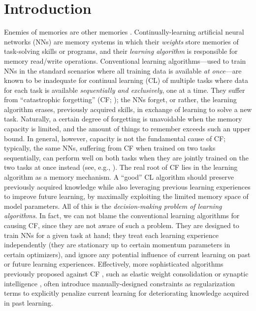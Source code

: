 \documentclass{article}
\begin{document}
\section{Introduction}
\label{sec:intro}
Enemies of memories are other memories \citep{eagleman2020livewired}.
Continually-learning artificial neural networks (NNs) are memory systems in which their \textit{weights} store memories of task-solving skills or programs, and their \textit{learning algorithm} is responsible for memory read/write operations.
Conventional learning algorithms---used to train NNs in the standard scenarios where all training data is available \textit{at once}---are known to be inadequate for continual learning (CL) of multiple tasks where data for each task is available \textit{sequentially and exclusively}, one at a time.
They suffer from ``catastrophic forgetting'' (CF; \citet{mccloskey1989catastrophic, ratcliff1990connectionist, french1999catastrophic,mcclelland1995there}); the NNs forget, or rather, the learning algorithm erases, previously acquired skills, in exchange of learning to solve a new task.
Naturally, a certain degree of forgetting is unavoidable when the memory capacity is limited, and the amount of things to remember exceeds such an upper bound.
In general, however, capacity is not the fundamental cause of CF;
typically, the same NNs, suffering from CF when trained on two tasks sequentially, can perform well on both tasks when they are jointly trained on the two tasks at once instead (see, e.g., \citet{irie2022dual}).
The real root of CF lies in the learning algorithm as a memory mechanism.
A ``good'' CL algorithm should preserve previously acquired knowledge while also leveraging previous learning experiences to improve future learning, by maximally exploiting the limited memory space of model parameters.
All of this is the \textit{decision-making problem of learning algorithms}.
In fact, we can not blame the conventional learning algorithms for causing CF, since they are not aware of such a problem.
They are designed to train NNs for a given task at hand; they treat each learning experience independently (they are stationary up to certain momentum parameters in certain optimizers),
and ignore any potential influence of current learning on past or future learning experiences.
Effectively, more sophisticated algorithms previously proposed against CF \citep{kortge1990episodic, french1991using}, such as elastic weight consolidation \citep{kirkpatrick2017overcoming, Schwarz0LGTPH18} or synaptic intelligence \citep{ZenkePG17}, often introduce manually-designed constraints as regularization terms to explicitly penalize current learning for deteriorating knowledge acquired in past learning.
\end{document}
